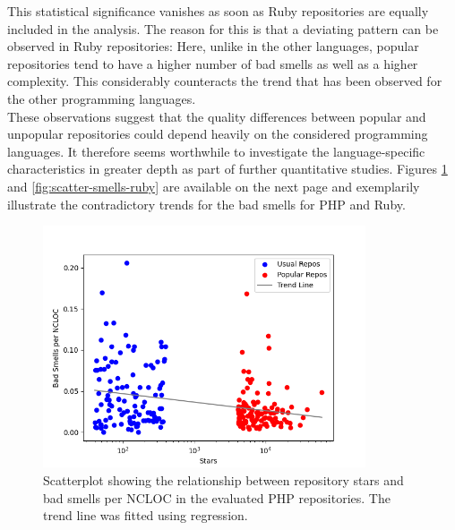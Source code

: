 \documentclass[a4paper, 12pt]{article}
\begin{document}
This statistical significance vanishes as soon as Ruby repositories are equally included in the analysis. The reason for this is that a deviating pattern can be observed in Ruby repositories: Here, unlike in the other languages, popular repositories tend to have a higher number of bad smells as well as a higher complexity. This considerably counteracts the trend that has been observed for the other programming languages.\\

These observations suggest that the quality differences between popular and unpopular repositories could depend heavily on the considered programming languages. It therefore seems worthwhile to investigate the language-specific characteristics in greater depth as part of further quantitative studies. Figures \ref{fig:scatter-smells} and \ref{fig:scatter-smells-ruby} are available on the next page and exemplarily illustrate the contradictory trends for the bad smells for PHP and Ruby.\\

\begin{figure}[h!]
  \centering
  \includegraphics[width=0.85\textwidth]{./media/php-smells-scatterplot.png}
  \caption{Scatterplot showing the relationship between repository stars and bad smells per NCLOC in the evaluated PHP repositories. The trend line was fitted using regression.}
  \label{fig:scatter-smells}
\end{figure}
\end{document}
